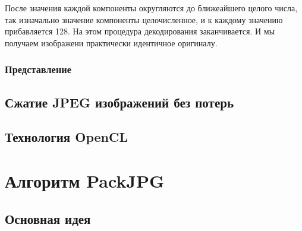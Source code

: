 \documentclass{matmex-diploma-custom}
\begin{document}
После значения  каждой компоненты округляются до ближеайшего целого числа, так изначально значение компоненты целочисленное, и к каждому значению прибавляется 128. На этом процедура декодирования заканчивается. И мы получаем изображени практически идентичное оригиналу.









\subsubsection{Представление}
\subsection{Сжатие JPEG изображений без потерь}
\subsection{Технология OpenCL}
\section{Алгоритм PackJPG}
\subsection{Основная идея}
\end{document}
